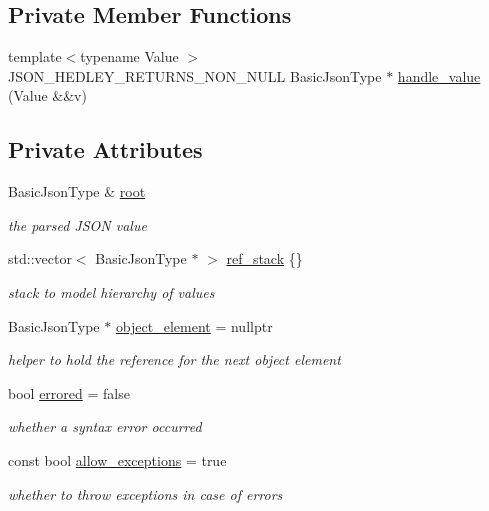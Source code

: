 \subsection*{Private Member Functions}
\begin{DoxyCompactItemize}
\item 
{\footnotesize template$<$typename Value $>$ }\\J\+S\+O\+N\+\_\+\+H\+E\+D\+L\+E\+Y\+\_\+\+R\+E\+T\+U\+R\+N\+S\+\_\+\+N\+O\+N\+\_\+\+N\+U\+LL Basic\+Json\+Type $\ast$ \hyperlink{classnlohmann_1_1detail_1_1json__sax__dom__parser_aa1a5e21be350727cf61a101aa5c6796e}{handle\+\_\+value} (Value \&\&v)
\end{DoxyCompactItemize}
\subsection*{Private Attributes}
\begin{DoxyCompactItemize}
\item 
Basic\+Json\+Type \& \hyperlink{classnlohmann_1_1detail_1_1json__sax__dom__parser_aef0477277389e399d7128898841b71c0}{root}
\begin{DoxyCompactList}\small\item\em the parsed J\+S\+ON value \end{DoxyCompactList}\item 
std\+::vector$<$ Basic\+Json\+Type $\ast$ $>$ \hyperlink{classnlohmann_1_1detail_1_1json__sax__dom__parser_aa7526e7ae7be7f63803a23fd8cf36e5d}{ref\+\_\+stack} \{\}
\begin{DoxyCompactList}\small\item\em stack to model hierarchy of values \end{DoxyCompactList}\item 
Basic\+Json\+Type $\ast$ \hyperlink{classnlohmann_1_1detail_1_1json__sax__dom__parser_a9c03c76d3a8e89c8928097ba0b92c2db}{object\+\_\+element} = nullptr
\begin{DoxyCompactList}\small\item\em helper to hold the reference for the next object element \end{DoxyCompactList}\item 
bool \hyperlink{classnlohmann_1_1detail_1_1json__sax__dom__parser_a31ccb472ed855e2f2370fd091d91aad7}{errored} = false
\begin{DoxyCompactList}\small\item\em whether a syntax error occurred \end{DoxyCompactList}\item 
const bool \hyperlink{classnlohmann_1_1detail_1_1json__sax__dom__parser_ad0953e8d888339421d909d9016bc6e2c}{allow\+\_\+exceptions} = true
\begin{DoxyCompactList}\small\item\em whether to throw exceptions in case of errors \end{DoxyCompactList}\end{DoxyCompactItemize}


